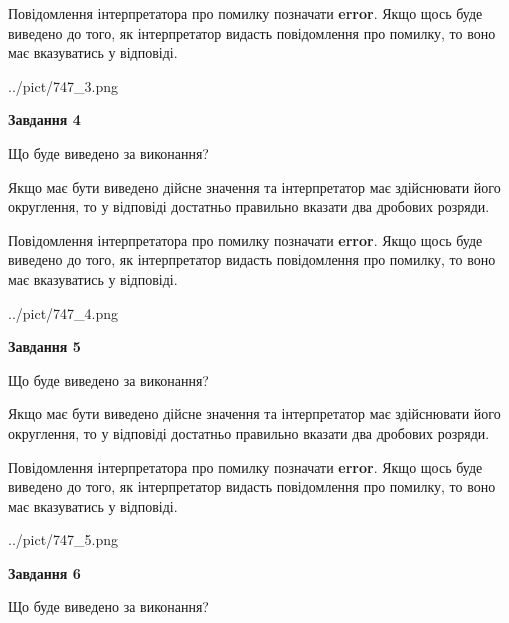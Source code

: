 \documentclass[12pt, ukrainian]{article}
\begin{document}
{\begin {Large}
Повідомлення інтерпретатора про помилку позначати \textbf{error}.
Якщо щось буде виведено до того, як інтерпретатор видасть повідомлення про помилку, 
то воно має вказуватись у відповіді. \par

\begin{center}
	{../pict/747_3.png}
\end{center}
\newpage

{\begin {center}\textbf{Завдання 4}\end {center}}\par
Що буде виведено за виконання? \par

Якщо має бути виведено дійсне значення та інтерпретатор має здійснювати його округлення, 
то у відповіді достатньо правильно вказати два дробових розряди.

Повідомлення інтерпретатора про помилку позначати \textbf{error}.
Якщо щось буде виведено до того, як інтерпретатор видасть повідомлення про помилку, 
то воно має вказуватись у відповіді. \par

\begin{center}
	{../pict/747_4.png}
\end{center}
\newpage

{\begin {center}\textbf{Завдання 5}\end {center}}\par
Що буде виведено за виконання? \par

Якщо має бути виведено дійсне значення та інтерпретатор має здійснювати його округлення, 
то у відповіді достатньо правильно вказати два дробових розряди.

Повідомлення інтерпретатора про помилку позначати \textbf{error}.
Якщо щось буде виведено до того, як інтерпретатор видасть повідомлення про помилку, 
то воно має вказуватись у відповіді. \par

\begin{center}
	{../pict/747_5.png}
\end{center}
\newpage

{\begin {center}\textbf{Завдання 6}\end {center}}\par
Що буде виведено за виконання? \par


\end{Large}}
\end{document}
